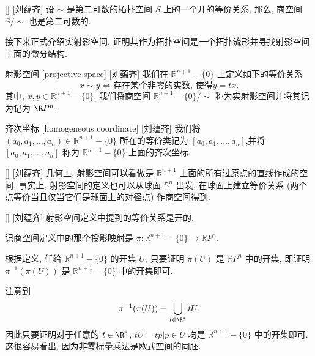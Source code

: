 \documentclass[UTF8]{ctexart}
\begin{document}
        \begin{crl}
            [corollorytwosecond]
            {}
            []
            [刘蕴齐]
            设 \( \sim \) 是第二可数的拓扑空间 \( S \) 上的一个开的等价关系, 那么, 商空间 \(S/\sim\) 也是第二可数的. 
        \end{crl}

        接下来正式介绍实射影空间, 证明其作为拓扑空间是一个拓扑流形并寻找射影空间上面的微分结构. 

        \begin{dfn}
            []
            {射影空间}
            [projective space]
            [刘蕴齐]
            我们在 \(\mathbb{R}^{n+1}-\{0\}\) 上定义如下的等价关系
            \[
                x \sim y \Leftrightarrow \text{存在某个非零的实数, 使得}y = tx. 
            \]
            其中,  \(x, y \in \mathbb{R}^{n+1}-\{0\}\). 我们将商空间 \(\mathbb{R}^{n+1}-\{0\} / \sim\) 称为实射影空间并将其记为记为 \(\R P^n\). 
        \end{dfn}

        \begin{dfn}
            []
            {齐次坐标}
            [homogeneous coordinate]
            [刘蕴齐]
            我们将 \((a_0, a_1, \dots, a_n) \in \mathbb{R}^{n+1}-\{0\}\) 所在的等价类记为 \([a_0, a_1, \dots, a_n]\),并将 \([a_0, a_1, \dots, a_n]\) 称为 \(\mathbb{R}^{n+1}-\{0\}\) 上面的齐次坐标. 
        \end{dfn}

        \begin{rmk}
            []
            {}
            []
            [刘蕴齐]
            几何上, 射影空间可以看做是 \(\mathbb{R}^{n+1}\) 上面的所有过原点的直线作成的空间. 事实上, 射影空间的定义也可以从球面 \(\mathbb{S}^n\) 出发, 在球面上建立等价关系 (两个点等价当且仅当它们是球面上的对径点) 作商空间得到. 
        \end{rmk}

        \begin{ppt}
            []
            {}
            []
            [刘蕴齐]
            射影空间定义中提到的等价关系是开的. 
        \end{ppt}

        \begin{prf}
            记商空间定义中的那个投影映射是 \(\pi: \mathbb{R}^{n+1} - \{0\} \rightarrow \mathbb{R}P^n\). 
            
            根据定义, 任给 \(\mathbb{R}^{n+1} - \{0\}\) 的开集 \(U\), 只要证明 \(\pi(U)\) 是 \(\mathbb{R}P^n\) 中的开集, 即证明 \(\pi^{-1}(\pi(U))\) 是 \(\mathbb{R}^{n+1} - \{0\}\) 中的开集即可. 

            注意到
            \[
            \pi^{-1}(\pi(U)) = \bigcup_{t \in \R^{*}} tU. 
            \]
            因此只要证明对于任意的 \(t \in \R^{*}\),  \(t U = {t p | p \in U}\) 均是 \(\mathbb{R}^{n+1} - \{0\}\) 中的开集即可. 这很容易看出, 因为非零标量乘法是欧式空间的同胚. 
        \end{prf}
\end{document}
